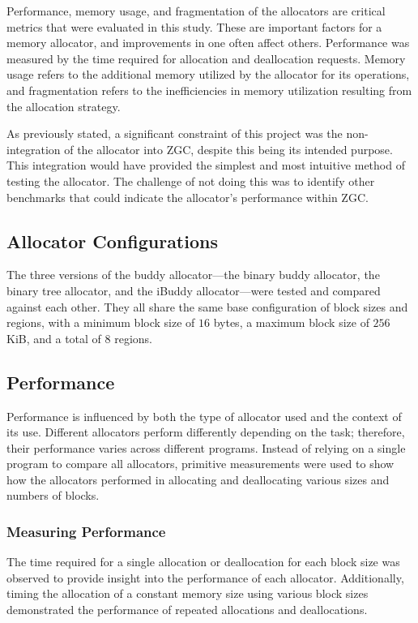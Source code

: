 Performance, memory usage, and fragmentation of the allocators are critical metrics that were evaluated in this study. These are important factors for a memory allocator, and improvements in one often affect others. Performance was measured by the time required for allocation and deallocation requests. Memory usage refers to the additional memory utilized by the allocator for its operations, and fragmentation refers to the inefficiencies in memory utilization resulting from the allocation strategy.

As previously stated, a significant constraint of this project was the non-integration of the allocator into ZGC, despite this being its intended purpose. This integration would have provided the simplest and most intuitive method of testing the allocator. The challenge of not doing this was to identify other benchmarks that could indicate the allocator's performance within ZGC.

\subsection{Allocator Configurations}
The three versions of the buddy allocator---the binary buddy allocator, the binary tree allocator, and the iBuddy allocator---were tested and compared against each other. They all share the same base configuration of block sizes and regions, with a minimum block size of $16$ bytes, a maximum block size of $256$ KiB, and a total of $8$ regions.

\subsection{Performance}
Performance is influenced by both the type of allocator used and the context of its use. Different allocators perform differently depending on the task; therefore, their performance varies across different programs. Instead of relying on a single program to compare all allocators, primitive measurements were used to show how the allocators performed in allocating and deallocating various sizes and numbers of blocks.

\subsubsection{Measuring Performance}
The time required for a single allocation or deallocation for each block size was observed to provide insight into the performance of each allocator. Additionally, timing the allocation of a constant memory size using various block sizes demonstrated the performance of repeated allocations and deallocations.

